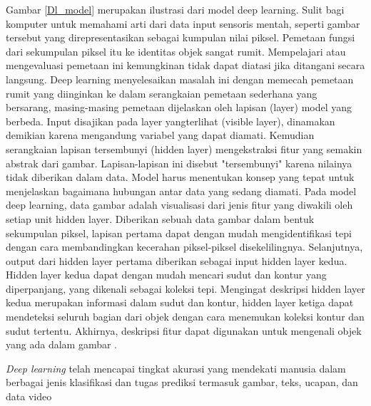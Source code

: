 \documentclass[../thesis.tex]{subfiles}
\begin{document}
Gambar \ref{Dl_model} merupakan ilustrasi dari model deep learning. Sulit bagi komputer untuk memahami arti dari data input sensoris mentah, seperti gambar tersebut yang direpresentasikan
sebagai kumpulan nilai piksel. Pemetaan fungsi dari sekumpulan piksel itu ke identitas objek sangat rumit. Mempelajari atau mengevaluasi pemetaan ini kemungkinan tidak dapat diatasi jika
ditangani secara langsung. Deep learning menyelesaikan masalah ini dengan memecah pemetaan rumit yang diinginkan ke dalam serangkaian pemetaan sederhana yang bersarang, masing-masing
pemetaan dijelaskan oleh lapisan (layer) model yang berbeda. Input disajikan pada layer yangterlihat (visible layer), dinamakan demikian karena mengandung variabel yang dapat diamati.
Kemudian serangkaian lapisan tersembunyi (hidden layer) mengekstraksi fitur yang semakin abstrak dari gambar. Lapisan-lapisan ini disebut "tersembunyi" karena nilainya tidak diberikan
dalam data. Model harus menentukan konsep yang tepat untuk menjelaskan bagaimana hubungan antar data yang sedang diamati. Pada model deep learning, data gambar adalah visualisasi dari 
jenis fitur yang diwakili oleh setiap unit hidden layer. Diberikan sebuah data gambar dalam bentuk sekumpulan piksel, lapisan pertama dapat dengan mudah mengidentifikasi tepi dengan cara
membandingkan kecerahan piksel-piksel disekelilingnya. Selanjutnya, output dari hidden layer pertama diberikan sebagai input hidden layer kedua. Hidden layer kedua dapat dengan mudah
mencari sudut dan kontur yang diperpanjang, yang dikenali sebagai koleksi tepi. Mengingat deskripsi hidden layer kedua merupakan informasi dalam sudut dan kontur, hidden layer ketiga
dapat mendeteksi seluruh bagian dari objek dengan cara menemukan koleksi kontur dan sudut tertentu. Akhirnya, deskripsi fitur dapat digunakan untuk mengenali objek yang ada dalam gambar
\cite{DLConcept}.

\textit{Deep learning} telah mencapai tingkat akurasi yang mendekati manusia dalam berbagai jenis klasifikasi dan tugas prediksi termasuk
gambar, teks, ucapan, dan data video \cite{CODL2018}
\end{document}
